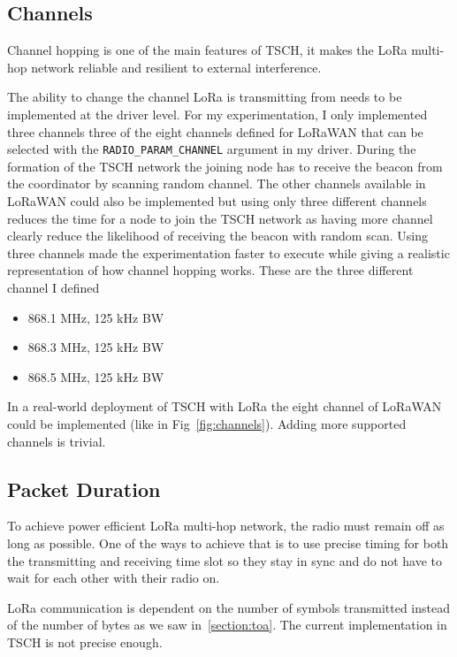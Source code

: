 \subsection{Channels}

Channel hopping is one of the main features of TSCH, it makes the LoRa multi-hop
network reliable and resilient to external interference.

The ability to change the channel LoRa is transmitting from needs to be
implemented at the driver level.
For my experimentation, I only implemented three channels three of the eight
channels defined for LoRaWAN that can be selected with the \lstinline{RADIO_PARAM_CHANNEL}
argument in my driver.
During the formation of the TSCH network the joining node has to receive the beacon from
the coordinator by scanning random channel.
The other channels available in LoRaWAN could also be implemented but
using only three different channels reduces the time for a node to join
the TSCH network as having more channel clearly reduce the likelihood of
receiving the beacon with random scan.
Using three channels made the experimentation faster to execute while giving a realistic
representation of how channel hopping works.
These are the three different channel I defined

\begin{itemize}
  \item 868.1 MHz, 125 kHz BW
  \item 868.3 MHz, 125 kHz BW
  \item 868.5 MHz, 125 kHz BW
\end{itemize}

In a real-world deployment of TSCH with LoRa the eight channel of LoRaWAN
could be implemented (like in Fig~\ref{fig:channels}).
Adding more supported channels is trivial.

\subsection{Packet Duration\label{section:transmissiontime}}

To achieve power efficient LoRa multi-hop network, the radio must remain
off as long as possible.
One of the ways to achieve that is to use precise timing for both the transmitting
and receiving time slot so they stay in sync and do not have to wait for each
other with their radio on.

LoRa communication is dependent on the number of symbols transmitted
instead of the number of bytes as we saw in~\ref{section:toa}.
The current implementation in TSCH is not precise enough.

